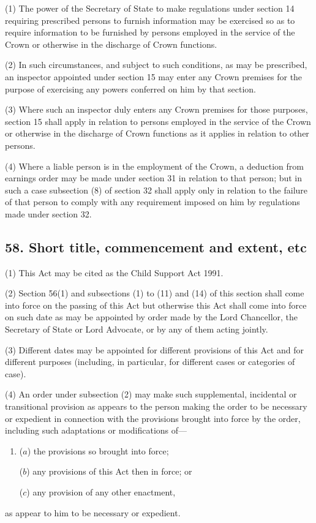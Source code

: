 \documentclass[12pt,a4paper]{article}
\begin{document}
(1) The power of the Secretary of State to make regulations under section 14 requiring prescribed persons to furnish information may be exercised so as to require information to be furnished by persons employed in the service of the Crown or otherwise in the discharge of Crown functions.

(2) In such circumstances, and subject to such conditions, as may be prescribed, an inspector appointed under section 15 may enter any Crown premises for the purpose of exercising any powers conferred on him by that section.

(3) Where such an inspector duly enters any Crown premises for those purposes, section 15 shall apply in relation to persons employed in the service of the Crown or otherwise in the discharge of Crown functions as it applies in relation to other persons.

(4) Where a liable person is in the employment of the Crown, a deduction from earnings order may be made under section 31 in relation to that person; but in such a case subsection (8)  of section 32 shall apply only in relation to the failure of that person to comply with any requirement imposed on him by regulations made under section 32.


\subsection{58. Short title, commencement and extent, etc}

(1) This Act may be cited as the Child Support Act 1991.

(2) Section 56(1)  and subsections (1)  to (11)  and (14)  of this section shall come into force on the passing of this Act but otherwise this Act shall come into force on such date as may be appointed by order made by the Lord Chancellor, the Secretary of State or Lord Advocate, or by any of them acting jointly.

(3) Different dates may be appointed for different provisions of this Act and for different purposes (including, in particular, for different cases or categories of case).

(4) An order under subsection (2)  may make such supplemental, incidental or transitional provision as appears to the person making the order to be necessary or expedient in connection with the provisions brought into force by the order, including such adaptations or modifications of—
\begin{enumerate}\item[]
($a$) the provisions so brought into force;

($b$) any provisions of this Act then in force; or

($c$) any provision of any other enactment,
\end{enumerate}
as appear to him to be necessary or expedient.
\end{document}
